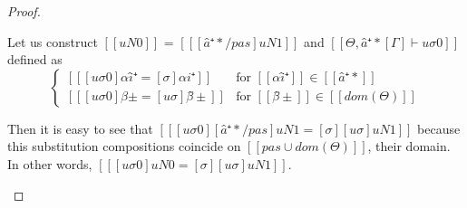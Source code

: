 \begin{proof}
\begin{caseof}
\begin{enumerate}
\begin{enumerate}
                            Let us construct $[[uN0]]$ = $[[ [â⁺*/pas]uN1 ]]$
                            and $[[Θ, â⁺*[Γ] ⊢ uσ0]]$ defined as
                            $$
                            \begin{cases}
                                [[ [uσ0]αî⁺ = [σ]αi⁺ ]] & \text{for $[[αî⁺]] \in  [[â⁺*]]$ }\\
                                [[ [uσ0]β̂± = [uσ]β̂± ]] & \text{for $[[β̂±]] \in [[dom(Θ)]]$}
                            \end{cases}
                            $$

                            Then it is easy to see that $[[ [uσ0][â⁺*/pas]uN1 = [σ][uσ]uN1 ]]$
                            because this substitution compositions coincide on 
                            $[[ {pas} ∪ dom(Θ) ]]$, their domain.
                            In other words, $[[ [uσ0]uN0 = [σ][uσ]uN1 ]]$.


\end{enumerate}
\end{enumerate}
\end{caseof}
\end{proof}
